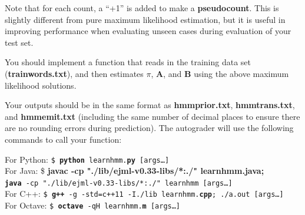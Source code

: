 \documentclass{article}
\begin{document}
Note that for each count, a ``+1'' is added to make a \textbf{pseudocount}. This is slightly different from pure maximum likelihood estimation, but it is useful in improving performance when evaluating unseen cases during evaluation of your test set.

You should implement a function that reads in the training data set (\textbf{trainwords.txt}), and then estimates {\boldmath$\pi$}, $\mathbf A$, and $\mathbf B$ using the above maximum likelihood solutions. 

Your outputs should be in the same format as \textbf{hmmprior.txt}, \textbf{hmmtrans.txt}, and \textbf{hmmemit.txt} (including the same number of decimal places to ensure there are no rounding errors during prediction). The autograder will use the following commands to call your function:

\begin{tabbing}
For Python: \=\texttt{\$ \textbf{python} learnhmm.\textbf{py} [args\dots]}\\
For Java: \>\$ \textbf{javac -cp "./lib/ejml-v0.33-libs/*:./" learnhmm.\textbf{java};}\\ \>  \texttt{\textbf{java} -cp "./lib/ejml-v0.33-libs/*:./" learnhmm [args\dots]}\\
For C++: \>\texttt{\$ \textbf{g++} -g -std=c++11 -I./lib learnhmm.\textbf{cpp}; ./a.out [args\dots]}\\
For Octave: \>\texttt{\$ \textbf{octave} -qH learnhmm.\textbf{m} [args\dots]}
\end{tabbing}
\end{document}

